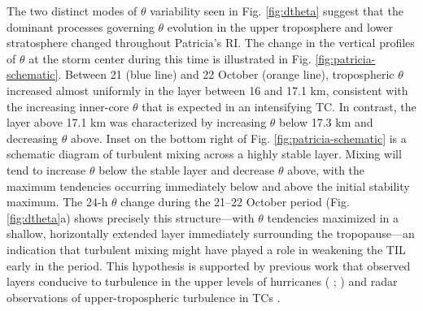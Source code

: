 The two distinct modes of $\theta$ variability seen in Fig. \ref{fig:dtheta} suggest that the dominant processes governing $\theta$ evolution in the upper troposphere and lower stratosphere changed throughout Patricia’s RI.
The change in the vertical profiles of $\theta$ at the storm center during this time is illustrated in Fig. \ref{fig:patricia-schematic}.
Between 21 (blue line) and 22 October (orange line), tropospheric $\theta$ increased almost uniformly in the layer between 16 and 17.1 km, consistent with the increasing inner-core $\theta$ that is expected in an intensifying TC.
In contrast, the layer above 17.1 km was characterized by increasing $\theta$ below 17.3 km and decreasing $\theta$ above.
Inset on the bottom right of Fig. \ref{fig:patricia-schematic} is a schematic diagram of turbulent mixing across a highly stable layer.
Mixing will tend to increase $\theta$ below the stable layer and decrease $\theta$ above, with the maximum tendencies occurring immediately below and above the initial stability maximum.
The 24-h $\theta$ change during the 21--22 October period (Fig. \ref{fig:dtheta}a) shows precisely this structure---with $\theta$ tendencies maximized in a shallow, horizontally extended layer immediately surrounding the tropopause---an indication that turbulent mixing might have played a role in weakening the TIL early in the period.
This hypothesis is supported by previous work that observed layers conducive to turbulence in the upper levels of hurricanes (\citeauthor{Molinarietal2014} \citeyear{Molinarietal2014}; \citeauthor{DuranMolinari2016} \citeyear{DuranMolinari2016}) and radar observations of upper-tropospheric turbulence in TCs \citep{Dasetal2008}.

